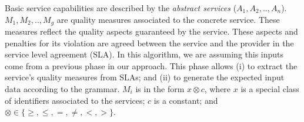 \begin{defi}
Basic service capabilities are described by the \textit{abstract services} ($A_{1}, A_{2}, .., A_{n}$).
$M_{1},M_{2}, .., M_{g}$ are quality measures associated to the concrete service. 
These measures reflect the quality aspects guaranteed by the service. These aspects and penalties for its violation are agreed between the service and the provider in the service level agreement (SLA).
%
In this algorithm, we are assuming this inputs come from a previous phase in our approach.
This phase allows (i) to extract the service's quality measures from SLAs; and (ii) to generate the expected input data according to the grammar.
%
$M_{i}$ is in the form $x \otimes c$, where $x$ is a special class of identifiers associated to the services; $c$ is a constant; and $\otimes \in\lbrace \geq, \leq, =, \neq, <, >\rbrace$.
\end{defi}
 
